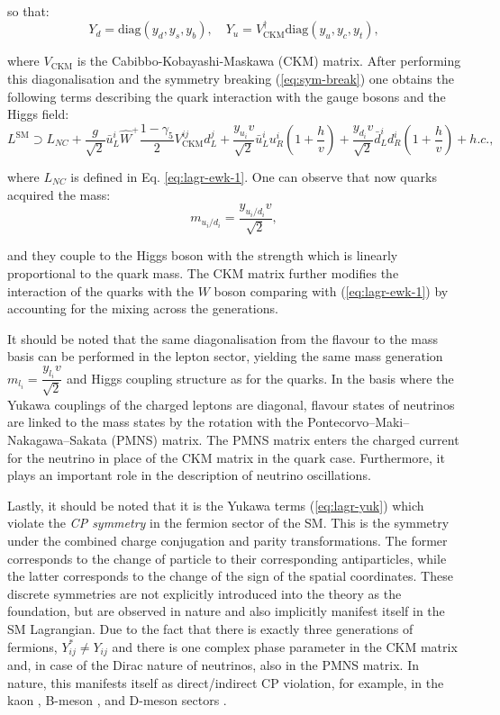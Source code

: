 so that:
\begin{equation}
    Y_d = \text{diag}(y_d, y_s, y_b), \quad Y_u = V_\text{CKM}^\dag\text{diag}(y_u, y_c, y_t),
\end{equation}

where $V_\text{CKM}$ is the Cabibbo-Kobayashi-Maskawa (CKM) matrix. After performing this diagonalisation and the symmetry breaking (\ref{eq:sym-break}) one obtains the following terms describing the quark interaction with the gauge bosons and the Higgs field:
\begin{equation}
    L^\text{SM} \supset L_{NC} + \dfrac{g}{\sqrt{2}}\bar{u}^i_L \hat{W}^+ \dfrac{1-\gamma_5}{2}V_\text{CKM}^{ij}d^j_L + \dfrac{y_{u_i}v}{\sqrt{2}}\bar{u}^i_L u^i_R\left(1+\dfrac{h}{v}\right) + \dfrac{y_{d_i}v}{\sqrt{2}}\bar{d}^i_L d^i_R\left(1+\dfrac{h}{v}\right) + h.c., 
\end{equation}

where $L_{NC}$ is defined in Eq. \ref{eq:lagr-ewk-1}. One can observe that now quarks acquired the mass:
\begin{equation}
    m_{u_i/d_i} = \dfrac{y_{u_i/d_i}v}{\sqrt{2}},
\end{equation}

and they couple to the Higgs boson with the strength which is linearly proportional to the quark mass. The CKM matrix further modifies the interaction of the quarks with the $W$ boson comparing with (\ref{eq:lagr-ewk-1}) by accounting for the mixing across the generations.

It should be noted that the same diagonalisation from the flavour to the mass basis can be performed in the lepton sector, yielding the same mass generation $m_{l_i} = \dfrac{y_{l_i} v}{\sqrt{2}}$ and Higgs coupling structure as for the quarks. In the basis where the Yukawa couplings of the charged leptons are diagonal, flavour states of neutrinos are linked to the mass states by the rotation with the Pontecorvo–Maki–Nakagawa–Sakata (PMNS) matrix. The PMNS matrix enters the charged current for the neutrino in place of the CKM matrix in the quark case. Furthermore, it plays an important role in the description of neutrino oscillations.

Lastly, it should be noted that it is the Yukawa terms (\ref{eq:lagr-yuk}) which violate the \textit{CP symmetry} in the fermion sector of the SM. This is the symmetry under the combined charge conjugation and parity transformations. The former corresponds to the change of particle to their corresponding antiparticles, while the latter corresponds to the change of the sign of the spatial coordinates. These discrete symmetries are not explicitly introduced into the theory as the foundation, but are observed in nature and also implicitly manifest itself in the SM Lagrangian. Due to the fact that there is exactly three generations of fermions, $Y_{ij}^* \neq Y_{ij}$ and there is one complex phase parameter in the CKM matrix and, in case of the Dirac nature of neutrinos, also in the PMNS matrix. In nature, this manifests itself as direct/indirect CP violation, for example, in the kaon \cite{KTeV:1999kad}, B-meson \cite{LHCb:2013syl}, and D-meson sectors \cite{LHCb:2019hro}.    


